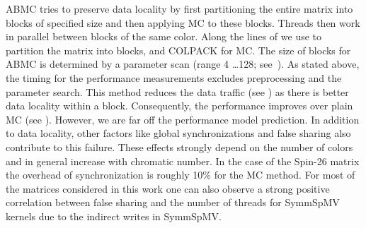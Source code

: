 \Acrshort{ABMC}\cite{ABMC} tries to preserve data locality by first partitioning
the entire matrix into blocks of specified size and then
applying \acrshort{MC} to these blocks. Threads then work in parallel
between blocks of the same color. Along the lines of \cite{Park_HPCG} 
we use \METIS \cite{METIS} to partition the matrix into blocks, and COLPACK 
for \acrshort{MC}. The size of blocks for \acrshort{ABMC} is
determined by a parameter scan (range 4 \ldots 128;
see~\cite{ABMC})\@. As stated above, the timing for the performance measurements
excludes preprocessing and the parameter search. This method reduces the 
data traffic (see ) as there is better data
locality within a block. Consequently, the performance improves
over plain \acrshort{MC} (see ). However,
we are far off the performance model prediction. In
addition to data locality, other factors like global synchronizations
and false sharing also contribute to this failure. These
effects strongly depend on the number of colors and in general
increase with chromatic number. In the case of the Spin-26 matrix the overhead of
synchronization is roughly 10\% for the \acrshort{MC} method.  For most of
the matrices considered in this work one can also observe a strong
positive correlation between false sharing and the number of threads
for \acrshort{SymmSpMV} kernels due to the indirect writes
in \acrshort{SymmSpMV}.
 
 



